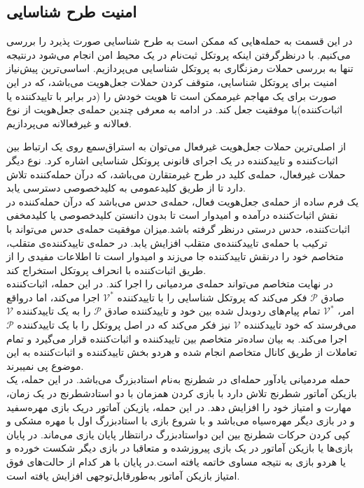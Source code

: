 \subsection{امنیت طرح شناسایی }\label{security_of_identification}
در این قسمت به حمله‌هایی که ممکن است به طرح شناسایی صورت پذیرد را بررسی می‌کنیم.
با درنظرگرفتن اینکه پروتکل ثبت‌نام در یک محیط امن انجام می‌شود درنتیجه تنها به بررسی حملات رمزنگاری به پروتکل شناسایی می‌پردازیم.
اساسی‌ترین پیش‌نیاز امنیت برای پروتکل شناسایی، متوقف کردن حملات جعل‌هویت
می‌باشد، که در این صورت برای یک مهاجم غیرممکن است تا هویت خودش را  (در برابر  با تاییدکننده یا اثبات‌کننده)با موفقیت جعل کند. در ادامه به معرفی چندین حمله‌ی جعل‌هویت از نوع فعالانه و غیرفعالانه می‌پردازیم.


از اصلی‌ترین حملات جعل‌هویت غیرفعال می‌توان به استراق‌سمع روی یک ارتباط بین اثبات‌کننده و تاییدکننده در یک اجرای قانونی پروتکل شناسایی اشاره کرد. نوع دیگر حملات غیرفعال، حمله‌ی کلید در طرح غیرمتقارن می‌باشد، که درآن حمله‌کننده تلاش دارد تا از طریق کلیدعمومی به کلیدخصوصی دسترسی یابد.
\\
یک فرم ساده از حمله‌ی جعل‌هویت فعال، حمله‌ی حدس
می‌باشد که درآن حمله‌کننده در نقش اثبات‌کننده درآمده و امیدوار است تا بدون دانستن کلیدخصوصی یا کلیدمخفی اثبات‌کننده، حدس درستی درنظر گرفته باشد.میزان موفقیت حمله‌ی حدس می‌تواند با ترکیب با حمله‌ی تاییدکننده‌ی متقلب
افزایش یابد.
در حمله‌ی تاییدکننده‌ی متقلب، متخاصم خود را درنقش تاییدکننده جا می‌زند و امیدوار است تا اطلاعات مفیدی را از طریق اثبات‌کننده با انحراف پروتکل استخراج کند.
\\
در نهایت متخاصم می‌تواند حمله‌ی مردمیانی 
را اجرا کند. در این حمله، اثبات‌کننده صادق
$\mathcal{P}$
فکر می‌کند که پروتکل شناسایی را با تاییدکننده‌
$\mathcal{V}^*$
اجرا می‌کند، اما درواقع امر،
$\mathcal{V}^*$
تمام پیام‌های ردوبدل شده بین خود و تاییدکننده صادق
$\mathcal{P}$
را به یک تاییدکننده
$\mathcal{V}$
می‌فرستد که خود تاییدکننده
$\mathcal{V}$
نیز فکر می‌کند که در اصل پروتکل را با یک تاییدکننده
$\mathcal{P}$
اجرا می‌کند. به بیان ساده‌تر متخاصم بین تاییدکننده و اثبات‌کننده قرار می‌گیرد و تمام تعاملات از طریق کانال متخاصم انجام شده و هردو بخش تاییدکننده و اثبات‌کننده به این موضوع پی نمیبرند.
\\
حمله مردمیانی یادآور حمله‌ای در شطرنج به‌نام استادبزرگ می‌باشد. در این حمله، یک بازیکن آماتور شطرنج تلاش دارد با بازی کردن همزمان با دو استادشطرنج در یک زمان، مهارت و امتیاز خود را افزایش دهد. در این حمله، یازیکن آماتور دریک بازی مهره‌سفید و در بازی دیگر مهره‌سیاه می‌باشد و با شروع بازی با استادبزرگ اول با مهره مشکی و کپی کردن حرکات شطرنج بین این دواستادبزرگ درانتظار پایان یازی می‌ماند. در پایان بازی‌ها یا بازیکن آماتور در یک بازی پیروزشده و متعاقبا در بازی دیگر شکست خورده و یا هردو بازی به نتیجه مساوی خاتمه یافته است.در پایان با هر کدام از حالت‌های فوق امتیاز بازیکن آماتور  به‌طورقابل‌توجهی افزایش یافته است.

